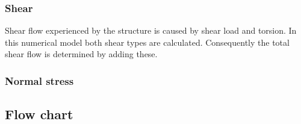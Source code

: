 \subsubsection{Shear}
Shear flow experienced by the structure is caused by shear load and torsion. In this numerical model both shear types are calculated. Consequently the total shear flow is determined by adding these.

\subsubsection{Normal stress}






\subsection{Flow chart}